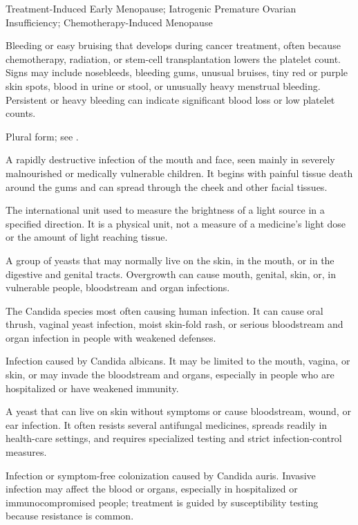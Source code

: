\synonyms
Treatment-Induced Early Menopause; Iatrogenic Premature Ovarian Insufficiency; Chemotherapy-Induced Menopause

 Bleeding or easy bruising that develops during cancer treatment, often because chemotherapy, radiation, or stem-cell transplantation lowers the platelet count. Signs may include nosebleeds, bleeding gums, unusual bruises, tiny red or purple skin spots, blood in urine or stool, or unusually heavy menstrual bleeding. Persistent or heavy bleeding can indicate significant blood loss or low platelet counts.

 Plural form; see .

 A rapidly destructive infection of the mouth and face, seen mainly in severely malnourished or medically vulnerable children. It begins with painful tissue death around the gums and can spread through the cheek and other facial tissues.

 The international unit used to measure the brightness of a light source in a specified direction. It is a physical unit, not a measure of a medicine's light dose or the amount of light reaching tissue.

 A group of yeasts that may normally live on the skin, in the mouth, or in the digestive and genital tracts. Overgrowth can cause mouth, genital, skin, or, in vulnerable people, bloodstream and organ infections.

 The Candida species most often causing human infection. It can cause oral thrush, vaginal yeast infection, moist skin-fold rash, or serious bloodstream and organ infection in people with weakened defenses.

 Infection caused by Candida albicans. It may be limited to the mouth, vagina, or skin, or may invade the bloodstream and organs, especially in people who are hospitalized or have weakened immunity.

 A yeast that can live on skin without symptoms or cause bloodstream, wound, or ear infection. It often resists several antifungal medicines, spreads readily in health-care settings, and requires specialized testing and strict infection-control measures.

 Infection or symptom-free colonization caused by Candida auris. Invasive infection may affect the blood or organs, especially in hospitalized or immunocompromised people; treatment is guided by susceptibility testing because resistance is common.

